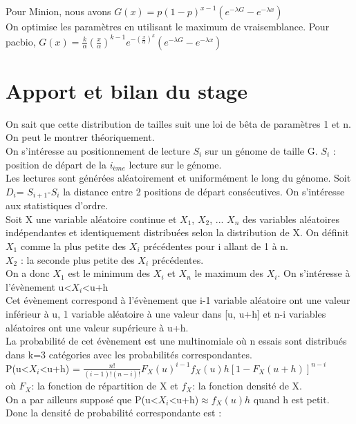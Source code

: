\documentclass[11pt,a4paper]{article} %
\begin{document}
Pour Minion, nous avons $G(x)= p(1-p)^{x-1} (e^{-\lambda G}-e^{-\lambda x}) $ \\
On optimise les paramètres en utilisant le maximum de vraisemblance.
Pour pacbio, $G(x)=\frac{k}{\alpha} (\frac{x}{\alpha})^{k-1}e^{-(\frac{x}{\alpha})^k} (e^{-\lambda G}-e^{-\lambda x})$

\section{Apport et bilan du stage} 



On sait que cette distribution de tailles suit une loi de bêta de paramètres 1 et n.
On peut le montrer théoriquement. \\
On s'intéresse au positionnement de lecture $S_{i}$ sur un génome de taille G. $S_{i}$ : position de départ de la $i_{ème}$ lecture sur le génome.\\
Les lectures sont générées aléatoirement et uniformément le long du génome.
Soit $D_{i}$= $S_{i+1}$-$S_{i}$ la distance entre 2 positions de départ consécutives.
On s'intéresse aux statistiques d'ordre.\\
Soit X une variable aléatoire continue et $X_{1}$, $X_{2}$, ... $X_{n}$ des variables aléatoires indépendantes et identiquement distribuées selon la distribution de X.
On définit $X_{1}$ comme la plus petite des $X_{i}$ précédentes pour i allant de 1 à n.\\
$X_{2}$ : la seconde plus petite des $X_{i}$ précédentes.\\
On a donc $X_{1}$ est le minimum des $X_{i}$ et $X_{n}$ le maximum des $X_{i}$.
On s'intéresse à l'évènement u<$X_{i}$<u+h\\
Cet évènement correspond à l'évènement que i-1 variable aléatoire ont une valeur inférieur à u, 1 variable aléatoire à une valeur dans [u, u+h] et n-i variables aléatoires ont une valeur supérieure à u+h.\\
La probabilité de cet évènement est une multinomiale où n essais sont distribués dans k=3 catégories avec les probabilités correspondantes.\\
P(u<$X_{i}$<u+h) = $\frac{n!}{(i-1)!(n-i)!} F_X(u)^{i-1}f_X(u)h[1-F_X(u+h)]^{n-i}$\\
où $F_X $: la fonction de répartition de X
et $f_X $: la fonction densité de X.\\
On a par ailleurs supposé que P(u<$X_{i}$<u+h)$\approx f_X(u)h$ quand h est petit.
Donc la densité de probabilité correspondante est :\\
\end{document}
